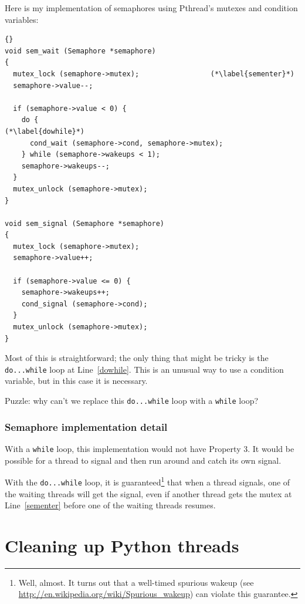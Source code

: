 \documentclass{book}
\newcommand{\clearemptydoublepage}{\newpage\cleardoublepage}
\begin{document}
Here is my implementation of semaphores using Pthread's mutexes
and condition variables:

\begin{lstlisting}[caption={}]{}
void sem_wait (Semaphore *semaphore)
{
  mutex_lock (semaphore->mutex);                 (*\label{sementer}*)
  semaphore->value--;

  if (semaphore->value < 0) {
    do {                                                (*\label{dowhile}*)
      cond_wait (semaphore->cond, semaphore->mutex);
    } while (semaphore->wakeups < 1);
    semaphore->wakeups--;
  }
  mutex_unlock (semaphore->mutex);
}

void sem_signal (Semaphore *semaphore)
{
  mutex_lock (semaphore->mutex);
  semaphore->value++;

  if (semaphore->value <= 0) {
    semaphore->wakeups++;
    cond_signal (semaphore->cond);
  }
  mutex_unlock (semaphore->mutex);
}
\end{lstlisting}

Most of this is straightforward; the only thing that might be 
tricky is the {\tt do...while} loop at Line~\ref{dowhile}.
This is an unusual way to use a condition variable, but in
this case it is necessary.

Puzzle: why can't we replace this {\tt do...while} loop
with a {\tt while} loop?

\clearemptydoublepage
\subsection{Semaphore implementation detail}

With a {\tt while} loop, this implementation would not have
Property 3.  It would be possible for a thread to signal
and then run around and catch its own signal.

With the {\tt do...while} loop, it is guaranteed\footnote{Well,
  almost.  It turns out that a well-timed spurious wakeup (see
  \url{http://en.wikipedia.org/wiki/Spurious_wakeup}) can violate this
  guarantee.} that when a thread signals, one of the waiting threads
will get the signal, even if another thread gets the mutex at
Line~\ref{sementer} before one of the waiting threads resumes.





\appendix

\chapter{Cleaning up Python threads}
\label{cleanup}
\end{document}
